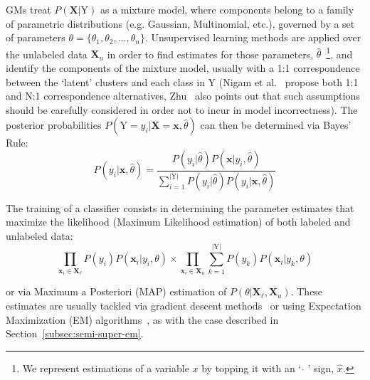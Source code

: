 GMs treat $P(\textbf{X}|\text{Y})$ as 
a mixture model, where components belong to a 
family of parametric distributions (e.g. Gaussian, Multinomial, etc.), governed 
by a set of parameters 
$\theta = \{\theta_1, \theta_2, ..., \theta_n\}$. Unsupervised learning methods 
are applied over the unlabeled data $\textbf{X}_u$ in order to find estimates 
for those parameters, $\hat{\theta}$~\footnote{We represent estimations of a variable $x$ by 
topping it with an ` $\hat{}$ ' sign, $\hat{x}$.}, and identify the 
components of the mixture model, usually with a 1:1 correspondence between 
the `latent' clusters and each class in Y (Nigam et al.~\cite{Nigam2000} 
propose both 1:1 and N:1 correspondence alternatives, Zhu~\cite{zhu05survey} also points 
out that such assumptions should be carefully considered in order not to 
incur in model incorrectness). The posterior 
probabilities $P(\text{Y} = y_i|\textbf{X} = \textbf{x}, \hat{\theta})$ can then be determined via Bayes' Rule:
\[P(y_i|\textbf{x}, \hat{\theta}) = \frac{P(y_i|\hat{\theta})P(\textbf{x}|y_i,\hat{\theta})}{\sum_{i=1}^{|\text{Y}|}P(y_i|\hat{\theta})P(y_i|\textbf{x},\hat{\theta})}\]

The training of a classifier consists in 
determining the parameter estimates that maximize the likelihood 
(Maximum Likelihood estimation) of both 
labeled and unlabeled data: 
\begin{equation}
    \prod_{\textbf{x}_i \in \textbf{X}_\ell}P(y_i)P(\textbf{x}_i|y_i,\theta) \times \prod_{\textbf{x}_i \in \textbf{X}_u}\sum_{k=1}^{|\text{Y}|}P(y_k)P(\textbf{x}_i|y_k,\theta)
    \label{eq:mle}
\end{equation}

or via Maximum a Posteriori (MAP) estimation of 
$P(\theta|\textbf{X}_\ell,\textbf{X}_u)$. These estimates are usually tackled 
via gradient descent methods~\cite{chapelle2010semi} or using Expectation Maximization (EM) 
algorithms~\cite{Nigam2000}, as with the case described in Section~\ref{subsec:semi-super-em}.


